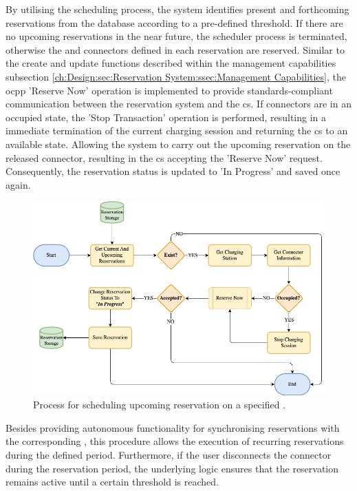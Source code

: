 By utilising the scheduling process, the system identifies present and forthcoming reservations from the database according to a pre-defined threshold. 
If there are no upcoming reservations in the near future, the scheduler process is terminated, otherwise the  and connectors defined in each reservation are reserved.
Similar to the create and update functions described within the management capabilities subsection \ref{ch:Design:sec:Reservation System:ssec:Management Capabilities}, the \acrshort{ocpp} 'Reserve Now' operation \cite{noauthor_ocpp_nodate} is implemented to provide standards-compliant communication between the reservation system and the \acrshort{cs}.
If connectors are in an occupied state, the 'Stop Transaction' operation is performed, resulting in a immediate termination of the current charging session and returning the \acrshort{cs} to an available state.
Allowing the system to carry out the upcoming reservation on the released connector, resulting in the \acrshort{cs} accepting the 'Reserve Now' request.
Consequently, the reservation status is updated to 'In Progress' and saved once again.

\begin{figure}[h]
    \centering
    \includegraphics[scale=0.4]{resources/images/main/5_design/processes/scheduler/SynchronizeReservation.png}
    \caption{Process for scheduling upcoming reservation on a specified .}
    \label{fig:schedule-reservation-flowchart}
\end{figure}

\noindent Besides providing autonomous functionality for synchronising reservations with the corresponding , this procedure allows the execution of recurring reservations during the defined period. 
Furthermore, if the user disconnects the connector during the reservation period, the underlying logic ensures that the reservation remains active until a certain threshold is reached.

